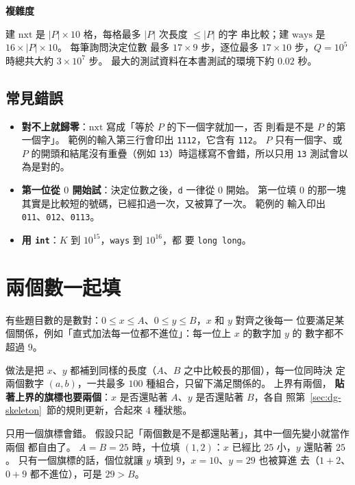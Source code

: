 \textbf{複雜度}

建 $\mathrm{nxt}$ 是 $|P| \times 10$ 格，每格最多 $|P|$ 次長度 $\le |P|$ 的字
串比較；建 $\mathrm{ways}$ 是 $16 \times |P| \times 10$。 每筆詢問決定位數
最多 $17 \times 9$ 步，逐位最多 $17 \times 10$ 步，$Q = 10^5$ 時總共大約
$3 \times 10^7$ 步。 最大的測試資料在本書測試的環境下約 $0.02$ 秒。

\subsection{常見錯誤}

\begin{itemize}
\item \textbf{對不上就歸零}：$\mathrm{nxt}$ 寫成「等於 $P$ 的下一個字就加一，否
則看是不是 $P$ 的第一個字」。 範例的輸入第三行會印出 \texttt{1112}，它含有
\texttt{112}。 $P$ 只有一個字、或 $P$ 的開頭和結尾沒有重疊（例如
\texttt{13}）時這樣寫不會錯，所以只用 \texttt{13} 測試會以為是對的。
\item \textbf{第一位從 $0$ 開始試}：決定位數之後，\texttt{d} 一律從 $0$ 開始。
第一位填 $0$ 的那一塊其實是比較短的號碼，已經扣過一次，又被算了一次。 範例的
輸入印出 \texttt{011}、\texttt{012}、\texttt{0113}。
\item \textbf{用 \texttt{int}}：$K$ 到 $10^{15}$，\texttt{ways} 到 $10^{16}$，都
要 \texttt{long long}。
\end{itemize}

\section{兩個數一起填}
\label{sec:dg-pairs}

有些題目數的是數對：$0 \le x \le A$、$0 \le y \le B$，$x$ 和 $y$ 對齊之後每一
位要滿足某個關係，例如「直式加法每一位都不進位」：每一位上 $x$ 的數字加 $y$ 的
數字都不超過 $9$。

做法是把 $x$、$y$ 都補到同樣的長度（$A$、$B$ 之中比較長的那個），每一位同時決
定兩個數字 $(a, b)$，一共最多 $100$ 種組合，只留下滿足關係的。 上界有兩個，
\textbf{貼著上界的旗標也要兩個}：$x$ 是否還貼著 $A$、$y$ 是否還貼著 $B$，各自
照第~\ref{sec:dg-skeleton}~節的規則更新，合起來 $4$ 種狀態。

只用一個旗標會錯。 假設只記「兩個數是不是都還貼著」，其中一個先變小就當作兩個
都自由了。 $A = B = 25$ 時，十位填 $(1, 2)$：$x$ 已經比 $25$ 小，$y$ 還貼著
$25$。 只有一個旗標的話，個位就讓 $y$ 填到 $9$，$x = 10$、$y = 29$ 也被算進
去（$1 + 2$、$0 + 9$ 都不進位），可是 $29 > B$。

